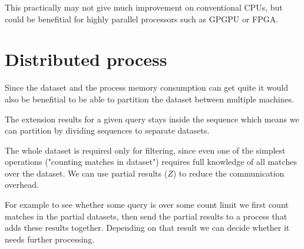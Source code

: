 
This practically may not give much improvement on conventional CPUs, but could be benefitial for
highly parallel processors such as GPGPU or FPGA.

\section{Distributed process}

Since the dataset and the process memory consumption can get quite it would also be benefitial to
be able to partition the dataset between multiple machines.

The extension results for a given query stays inside the sequence which means we can partition by dividing
sequences to separate datasets.

The whole dataset is required only for filtering, since even one of the simplest operations ("counting matches in dataset") requires full knowledge of all matches over the dataset. We can use partial results ($Z$) to reduce the communication overhead.

\begin{figure}[H]
	
\end{figure}

For example to see whether some query is over some count limit we first count matches in the partial datasets, then send the partial results to a process that adds these results together. Depending on that result we can decide whether it needs further processing.
